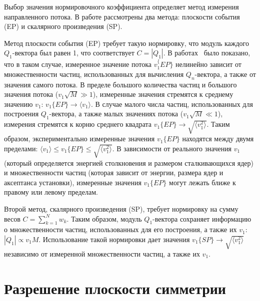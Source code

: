 Выбор значения нормировочного коэффициента определяет метод измерения направленного потока. 
В работе рассмотрены два метода: плоскости события (EP) и скалярного произведения (SP). 

Метод плоскости события (EP) требует такую нормировку, что модуль каждого $Q_1$-вектора был равен 1, что соответствует $C=|Q_1|$. 
В работах~\cite{Borghini:2001vi, Bhalerao:2006tp} было показано, что в таком случае, измеренное значение потока $v_1^\{EP\}$ нелинейно зависит от множественности частиц, использованных для вычисления $Q_n$-вектора, а также от значения самого потока. 
В пределе большого количества частиц и большого значения потока ($v_1 \sqrt{M} \gg 1$), измеренные значения стремятся к среднему значению $v_1$: $v_1\{EP\} \xrightarrow{} \langle v_1 \rangle$. 
В случае малого числа частиц, использованных для построения $Q_1$-вектора, а также малых значениях потока ($v_1 \sqrt{M} \ll 1$), измерения стремятся к корню среднего квадрата $ v_1\{EP\} \xrightarrow{} \sqrt{ \langle v_1^2 \rangle }$.
Таким образом, экспериментально измеренные значения $v_1\{EP\}$ находятся между двумя пределами: $ \langle v_1 \rangle \leq v_1\{EP\} \leq \sqrt{ \langle v_1^2 \rangle } $.
В зависимости от реального значения $v_1$ (который определяется энергией столкновения и размером сталкивающихся ядер) и множественности частиц (которая зависит от энергии, размера ядер и аксептанса установки), измеренные значения $v_1\{EP\}$ могут лежать ближе к правому или левому пределам.

Второй метод, скалярного произведения (SP), требует нормировку на сумму весов $C=\sum_{k=1}^N w_k$.
Таким образом, модуль $Q_1$-вектора сохраняет информацию о множественности частиц, использованных для его построения, а также их $v_1$: $|Q_1| \propto v_1 M$.
Использование такой нормировки дает значения $v_1\{SP\} \xrightarrow{} \sqrt{\langle v_1^2 \rangle}$ независимо от измеренной множественности частиц, а также их $v_1$.

\section{Разрешение плоскости симметрии}


